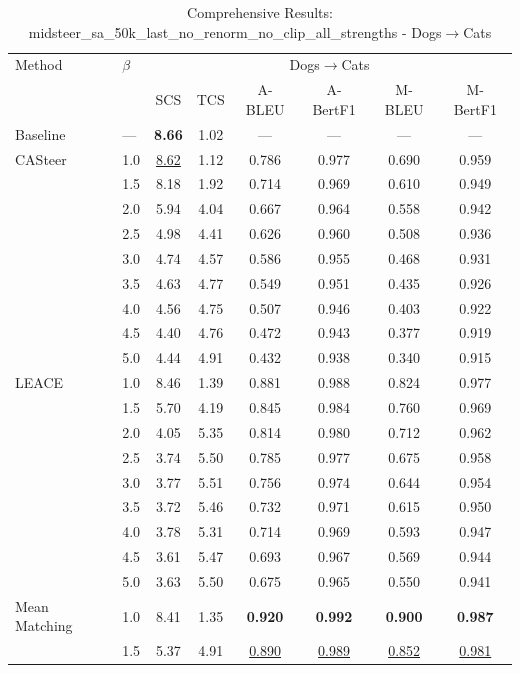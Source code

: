 \begin{table}[htbp]
\centering
\caption{Comprehensive Results: midsteer\_sa\_50k\_last\_no\_renorm\_no\_clip\_all\_strengths - Dogs$\rightarrow$Cats}
\label{tab:midsteersa50klastnorenormnoclipallstrengths_dogstocats}
\begin{tabular}{l|l|cccccc|}
\hline
Method & $\beta$ & \multicolumn{6}{c|}{Dogs$\rightarrow$Cats} \\
 &  & SCS & TCS & A-BLEU & A-BertF1 & M-BLEU & M-BertF1 \\
\hline
Baseline & — & \textbf{8.66} & 1.02 & — & — & — & — \\
\hline
CASteer & 1.0 & \underline{8.62} & 1.12 & 0.786 & 0.977 & 0.690 & 0.959 \\
 & 1.5 & 8.18 & 1.92 & 0.714 & 0.969 & 0.610 & 0.949 \\
 & 2.0 & 5.94 & 4.04 & 0.667 & 0.964 & 0.558 & 0.942 \\
 & 2.5 & 4.98 & 4.41 & 0.626 & 0.960 & 0.508 & 0.936 \\
 & 3.0 & 4.74 & 4.57 & 0.586 & 0.955 & 0.468 & 0.931 \\
 & 3.5 & 4.63 & 4.77 & 0.549 & 0.951 & 0.435 & 0.926 \\
 & 4.0 & 4.56 & 4.75 & 0.507 & 0.946 & 0.403 & 0.922 \\
 & 4.5 & 4.40 & 4.76 & 0.472 & 0.943 & 0.377 & 0.919 \\
 & 5.0 & 4.44 & 4.91 & 0.432 & 0.938 & 0.340 & 0.915 \\
\hline
LEACE & 1.0 & 8.46 & 1.39 & 0.881 & 0.988 & 0.824 & 0.977 \\
 & 1.5 & 5.70 & 4.19 & 0.845 & 0.984 & 0.760 & 0.969 \\
 & 2.0 & 4.05 & 5.35 & 0.814 & 0.980 & 0.712 & 0.962 \\
 & 2.5 & 3.74 & 5.50 & 0.785 & 0.977 & 0.675 & 0.958 \\
 & 3.0 & 3.77 & 5.51 & 0.756 & 0.974 & 0.644 & 0.954 \\
 & 3.5 & 3.72 & 5.46 & 0.732 & 0.971 & 0.615 & 0.950 \\
 & 4.0 & 3.78 & 5.31 & 0.714 & 0.969 & 0.593 & 0.947 \\
 & 4.5 & 3.61 & 5.47 & 0.693 & 0.967 & 0.569 & 0.944 \\
 & 5.0 & 3.63 & 5.50 & 0.675 & 0.965 & 0.550 & 0.941 \\
\hline
Mean Matching & 1.0 & 8.41 & 1.35 & \textbf{0.920} & \textbf{0.992} & \textbf{0.900} & \textbf{0.987} \\
 & 1.5 & 5.37 & 4.91 & \underline{0.890} & \underline{0.989} & \underline{0.852} & \underline{0.981} \\

\end{tabular}
\end{table}
